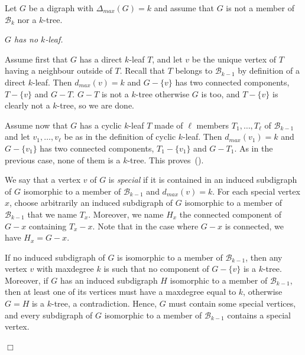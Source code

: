 \documentclass[11pt]{article}
\newcommand{\mc}{\mathcal}
\newcommand{\dmax}{\Delta_{max}}
\newcounter{claim}
\newenvironment{proof}[1][]%
 {\noindent {\setcounter{claim}{0}\sc proof ---
   }{#1}{}}{\hfill$\Box$\vspace{2ex}}
\newenvironment{claim}[1][]%
{\refstepcounter{claim}\vspace{1ex}\noindent{(\it\arabic{claim}){#1}{}}\it}{\vspace{1ex}}
\newenvironment{proofclaim}[1][]%
	{\noindent {}{#1}{}}{ This proves~(\arabic{claim}).\vspace{2ex}}
\begin{document}
\begin{proof}
Let $G$ be a digraph with $\dmax(G) = k$ and assume that $G$ is not a member of $\mathcal B_k$ nor a $k$-tree. 

\begin{claim}\label{clm:no_leaf}
$G$ has no $k$-leaf.
\end{claim}

\begin{proofclaim}
Assume first that $G$ has a direct $k$-leaf $T$, and let $v$ be the unique vertex of $T$ having a neighbour outside of $T$. Recall that $T$ belongs to $\mathcal B_{k-1}$ by definition of a direct $k$-leaf. 
Then $d_{max}(v) = k$ and $G-\{v\}$  has two connected components, $T-\{v\}$ and $G -T$. $G-T$ is not a $k$-tree otherwise $G$ is too, and $T-\{v\}$ is clearly not a $k$-tree, so we are done. 

Assume now that $G$ has a cyclic $k$-leaf $T$ made of $\ell$ members $T_1, \dots, T_{\ell}$ of $\mathcal B_{k-1}$ and let $v_1, \dots, v_{\ell}$ be as in the definition of cyclic $k$-leaf. Then $d_{max}(v_1) = k$ and $G - \{v_1\}$ has two connected components, $T_1-\{v_1\}$ and $G-T_1$. As in the previous case, none of them is a $k$-tree. 
\end{proofclaim}

We say that a vertex $v$ of $G$ is \textit{special} if it is contained in an induced subdigraph  of $G$ isomorphic to a member of $\mc B_{k-1}$ and $d_{max}(v) = k$. 
For each special vertex $x$, choose arbitrarily an induced subdigraph of $G$ isomorphic to a member of $\mathcal B_{k-1}$ that we name $T_x$. Moreover, we name $H_x$ the connected component of $G-x$ containing $T_x - x$. Note that in the case where $G- x$ is connected, we have $H_{x} = G- x$. 

If no induced subdigraph of $G$ is isomorphic to a member of $\mathcal B_{k-1}$, then any vertex $v$ with maxdegree $k$ is such that no component of $G - \{v\}$ is a $k$-tree. 
Moreover, if $G$ has an induced subdigraph $H$ isomorphic to a member of $\mc B_{k-1}$, then at least one of its vertices must have a maxdegree equal to $k$, otherwise $G = H$ is a $k$-tree, a contradiction. 
Hence, $G$ must contain some special vertices, and every subdigraph of $G$ isomorphic to a member of $\mathcal B_{k-1}$ contains a special vertex. 
\medskip


\end{proof}
\end{document}
